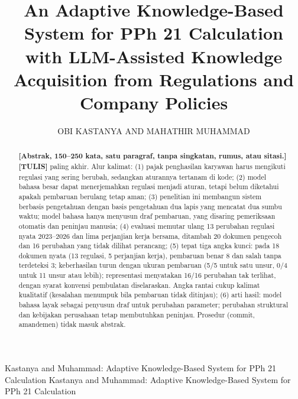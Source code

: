 \documentclass{ieeeaccess}
\newcommand{\TULIS}{\textcolor{sttulis}{\textbf{[TULIS]}}}
\newenvironment{isi}{\par\smallskip\footnotesize\color{draftblue}\noindent}{\par\smallskip\normalsize\color{black}}
\begin{document}

\title{An Adaptive Knowledge-Based System for PPh 21 Calculation with LLM-Assisted Knowledge Acquisition from Regulations and Company Policies}

\author{\uppercase{Obi Kastanya}
AND \uppercase{Mahathir Muhammad}}

\address[1]{Department of Informatics, Institut Teknologi Sepuluh Nopember, Surabaya 60111, Indonesia
(e-mail: 6025252015@student.its.ac.id; 6025252008@student.its.ac.id)}

\markboth
{Kastanya and Muhammad: Adaptive Knowledge-Based System for PPh 21 Calculation}
{Kastanya and Muhammad: Adaptive Knowledge-Based System for PPh 21 Calculation}


\begin{abstract}
\begin{isi}
\textbf{[Abstrak, 150--250 kata, satu paragraf, tanpa singkatan, rumus, atau sitasi.]} \TULIS{} paling akhir.
Alur kalimat:
(1) pajak penghasilan karyawan harus mengikuti regulasi yang sering berubah, sedangkan aturannya tertanam di kode;
(2) model bahasa besar dapat menerjemahkan regulasi menjadi aturan, tetapi belum diketahui apakah pembaruan berulang tetap aman;
(3) penelitian ini membangun sistem berbasis pengetahuan dengan basis pengetahuan dua lapis yang mencatat dua sumbu waktu; model bahasa hanya menyusun draf pembaruan, yang disaring pemeriksaan otomatis dan peninjau manusia;
(4) evaluasi memutar ulang 13 perubahan regulasi nyata 2023--2026 dan lima perjanjian kerja bersama, ditambah 20 dokumen pengecoh dan 16 perubahan yang tidak dilihat perancang;
(5) tepat tiga angka kunci: pada 18 dokumen nyata (13 regulasi, 5 perjanjian kerja), pembaruan benar 8 dan salah tanpa terdeteksi 3; keberhasilan turun dengan ukuran pembaruan (5/5 untuk satu unsur, 0/4 untuk 11 unsur atau lebih); representasi menyatakan 16/16 perubahan tak terlihat, dengan syarat konvensi pembulatan diselaraskan. Angka rantai cukup kalimat kualitatif (kesalahan menumpuk bila pembaruan tidak ditinjau);
(6) arti hasil: model bahasa layak sebagai penyusun draf untuk perubahan parameter; perubahan struktural dan kebijakan perusahaan tetap membutuhkan peninjau.
Prosedur (commit, amandemen) tidak masuk abstrak.
\end{isi}
\end{abstract}
\end{document}
